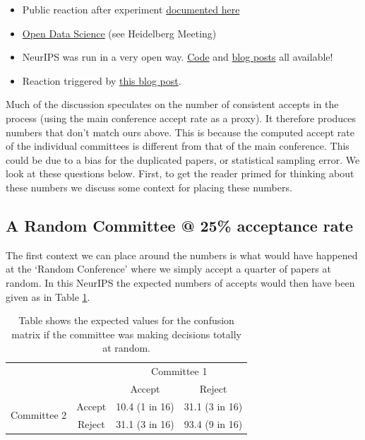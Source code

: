 \begin{itemize}
\item
  Public reaction after experiment
  \href{http://inverseprobability.com/2015/01/16/blogs-on-the-NeurIPS-experiment/}{documented
  here}
\item
  \href{http://inverseprobability.com/2014/07/01/open-data-science/}{Open
  Data Science} (see Heidelberg Meeting)
\item
  NeurIPS was run in a very open way.
  \href{https://github.com/sods/conference}{Code} and
  \href{http://inverseprobability.com/2014/12/16/the-NeurIPS-experiment/}{blog
  posts} all available!
\item
  Reaction triggered by
  \href{http://blog.mrtz.org/2014/12/15/the-NeurIPS-experiment.html}{this
  blog post}.
\end{itemize}

Much of the discussion speculates on the number of consistent accepts in
the process (using the main conference accept rate as a proxy). It
therefore produces numbers that don't match ours above. This is because
the computed accept rate of the individual committees is different from
that of the main conference. This could be due to a bias for the
duplicated papers, or statistical sampling error. We look at these
questions below. First, to get the reader primed for thinking about
these numbers we discuss some context for placing these numbers.

\hypertarget{a-random-committee-25}{%
\subsection{A Random Committee @ 25\% acceptance rate}\label{a-random-committee-25}}

\begin{flushright}
\end{flushright}

The first context we can place around the numbers is what would have
happened at the `Random Conference' where we simply accept a quarter of
papers at random. In this NeurIPS the expected numbers of accepts would
then have been given as in Table \ref{table-random-committee}.

\begin{table}[htb]
\caption{Table shows the expected values for the confusion matrix if the committee was making decisions totally at random.}
\label{table-random-committee}



  \begin{tabular}{lc|c|c|}
  & & \multicolumn{2}{c}{Committee 1} \\
  & & Accept & Reject \\
  \multirow{2}{*}{Committee 2} & Accept & 10.4 (1 in 16) & 31.1 (3 in 16) \\ 
  & Reject & 31.1 (3 in 16) & 93.4 (9 in 16)
  \end{tabular}
\end{table}

